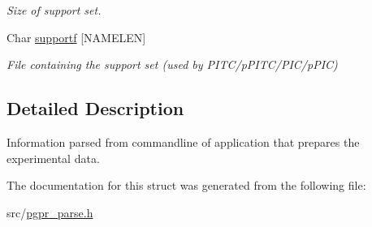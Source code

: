 \begin{DoxyCompactItemize}
\begin{DoxyCompactList}\small\item\em Size of support set. \end{DoxyCompactList}\item 
\hypertarget{structt__command__prep_a19ce353138f10d386cbd54bb9f4edb02}{Char \hyperlink{structt__command__prep_a19ce353138f10d386cbd54bb9f4edb02}{supportf} \mbox{[}N\+A\+M\+E\+L\+E\+N\mbox{]}}\label{structt__command__prep_a19ce353138f10d386cbd54bb9f4edb02}

\begin{DoxyCompactList}\small\item\em File containing the support set (used by P\+I\+T\+C/p\+P\+I\+T\+C/\+P\+I\+C/p\+P\+I\+C) \end{DoxyCompactList}\end{DoxyCompactItemize}


\subsection{Detailed Description}
Information parsed from commandline of application that prepares the experimental data. 

The documentation for this struct was generated from the following file\+:\begin{DoxyCompactItemize}
\item 
src/\hyperlink{pgpr__parse_8h}{pgpr\+\_\+parse.\+h}\end{DoxyCompactItemize}

